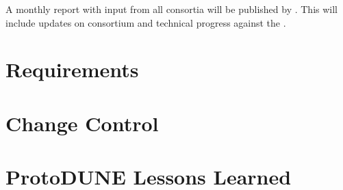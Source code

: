 A monthly report with input from all consortia will be published by
. This will include updates on consortium and 
technical progress against the .

\section{Requirements}
\label{sec:fdsp-coord-requirements}

\section{Change Control}
\label{sec:fdsp-coord-change}

\section{ProtoDUNE Lessons Learned}
\label{sec:fdsp-coord-lessonslearned}
